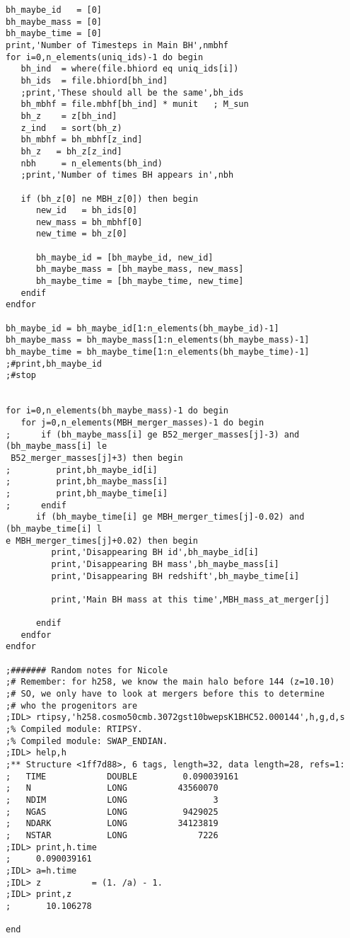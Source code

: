\documentclass[12pt,headA,chapB]{fiskthesis}
\begin{document}
\begin{verbatim}
bh_maybe_id   = [0]
bh_maybe_mass = [0]
bh_maybe_time = [0]
print,'Number of Timesteps in Main BH',nmbhf
for i=0,n_elements(uniq_ids)-1 do begin
   bh_ind  = where(file.bhiord eq uniq_ids[i])
   bh_ids  = file.bhiord[bh_ind]
   ;print,'These should all be the same',bh_ids
   bh_mbhf = file.mbhf[bh_ind] * munit   ; M_sun
   bh_z    = z[bh_ind]
   z_ind   = sort(bh_z)
   bh_mbhf = bh_mbhf[z_ind]
   bh_z   = bh_z[z_ind]
   nbh     = n_elements(bh_ind)
   ;print,'Number of times BH appears in',nbh

   if (bh_z[0] ne MBH_z[0]) then begin
      new_id   = bh_ids[0]
      new_mass = bh_mbhf[0]
      new_time = bh_z[0]
      
      bh_maybe_id = [bh_maybe_id, new_id]
      bh_maybe_mass = [bh_maybe_mass, new_mass]
      bh_maybe_time = [bh_maybe_time, new_time]
   endif
endfor

bh_maybe_id = bh_maybe_id[1:n_elements(bh_maybe_id)-1]
bh_maybe_mass = bh_maybe_mass[1:n_elements(bh_maybe_mass)-1]
bh_maybe_time = bh_maybe_time[1:n_elements(bh_maybe_time)-1]
;#print,bh_maybe_id
;#stop


for i=0,n_elements(bh_maybe_mass)-1 do begin
   for j=0,n_elements(MBH_merger_masses)-1 do begin
;      if (bh_maybe_mass[i] ge B52_merger_masses[j]-3) and (bh_maybe_mass[i] le
 B52_merger_masses[j]+3) then begin
;         print,bh_maybe_id[i]
;         print,bh_maybe_mass[i]
;         print,bh_maybe_time[i]
;      endif
      if (bh_maybe_time[i] ge MBH_merger_times[j]-0.02) and (bh_maybe_time[i] l
e MBH_merger_times[j]+0.02) then begin
         print,'Disappearing BH id',bh_maybe_id[i]
         print,'Disappearing BH mass',bh_maybe_mass[i]
         print,'Disappearing BH redshift',bh_maybe_time[i]

         print,'Main BH mass at this time',MBH_mass_at_merger[j]

      endif
   endfor
endfor

;####### Random notes for Nicole 
;# Remember: for h258, we know the main halo before 144 (z=10.10)
;# SO, we only have to look at mergers before this to determine
;# who the progenitors are
;IDL> rtipsy,'h258.cosmo50cmb.3072gst10bwepsK1BHC52.000144',h,g,d,s
;% Compiled module: RTIPSY.
;% Compiled module: SWAP_ENDIAN.
;IDL> help,h
;** Structure <1ff7d88>, 6 tags, length=32, data length=28, refs=1:
;   TIME            DOUBLE         0.090039161
;   N               LONG          43560070
;   NDIM            LONG                 3
;   NGAS            LONG           9429025
;   NDARK           LONG          34123819
;   NSTAR           LONG              7226
;IDL> print,h.time
;     0.090039161
;IDL> a=h.time
;IDL> z          = (1. /a) - 1.
;IDL> print,z
;       10.106278

end
\end{verbatim}
\end{document}
